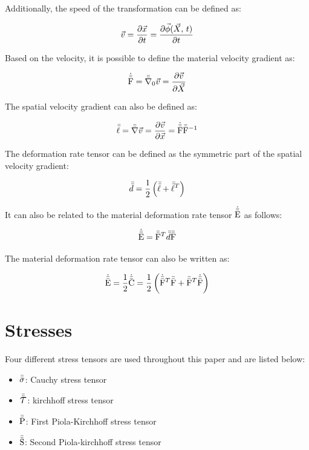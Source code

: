 Additionally, the speed of the transformation can be defined as:

\begin{equation} \label{eq:velocity}
    \vec{v} = \frac{\partial \vec{x}}{\partial t} = \frac{\partial \vec{\phi} (\vec{X}, \, t)}{\partial t}
\end{equation}

Based on the velocity, it is possible to define the material velocity gradient as:

\begin{equation} \label{eq:material_velocity_gradient}
    \dot{\bar{\bar{\mathrm{F}}}} = \bar{\bar{\nabla}}_\mathrm{0} \vec{v} = \frac{\partial \vec{v}}{\partial \vec{X}}
\end{equation}

The spatial velocity gradient can also be defined as:

\begin{equation} \label{eq:spatial_velocity_gradient}
    \bar{\bar{\ell}} = \bar{\bar{\nabla}} \vec{v} = \frac{\partial \vec{v}}{\partial \vec{x}} = \dot{\bar{\bar{\mathrm{F}}}} \bar{\bar{\mathrm{F}}}^{-1} 
\end{equation}

The deformation rate tensor can be defined as the symmetric part of the spatial velocity gradient:

\begin{equation} \label{eq:spatial_deformation_rate}
    \bar{\bar{d}} = \frac{1}{2} \left( \bar{\bar{\ell}} + \bar{\bar{\ell}}^T \right)
\end{equation}

It can also be related to the material deformation rate tensor $\dot{\bar{\bar{\mathrm{E}}}}$ as follows:

\begin{equation} \label{eq:material_deformation_rate}
    \dot{\bar{\bar{\mathrm{E}}}} = \bar{\bar{\mathrm{F}}}^T \bar{\bar{d}} \bar{\bar{\mathrm{F}}}
\end{equation}

The material deformation rate tensor can also be written as:

\begin{equation} \label{eq:material_deformation_rate_2}
    \dot{\bar{\bar{\mathrm{E}}}} = \frac{1}{2} \dot{\bar{\bar{\mathrm{C}}}} = \frac{1}{2} \left( \dot{\bar{\bar{\mathrm{F}}}}^T \bar{\bar{\mathrm{F}}} + \bar{\bar{\mathrm{F}}}^T \dot{\bar{\bar{\mathrm{F}}}} \right)
\end{equation}



\section{Stresses}

Four different stress tensors are used throughout this paper and are listed below:

\begin{itemize}
    \item $\bar{\bar{\sigma}}$: Cauchy stress tensor
    \item $\kirchhoff$: kirchhoff stress tensor
    \item $\bar{\bar{\mathrm{P}}}$: First Piola-Kirchhoff stress tensor
    \item $\bar{\bar{\mathrm{S}}}$: Second Piola-kirchhoff stress tensor
\end{itemize}

